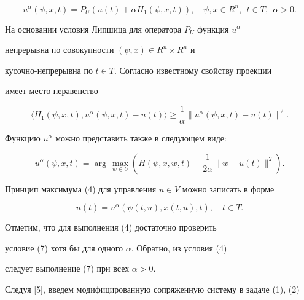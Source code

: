 $$


u^{\alpha}(\psi,x,t)=P_{U}(u(t)+\alpha{H_1}(\psi,x,t)),\quad\psi,x\in{R^n},


\ \ t\in{T}, \ \ \alpha>0.


$$





На основании условия Липшица для оператора $P_{U}$ функция $u^\alpha$


непрерывна по совокупности $(\psi,x)\in{R^n}\times{R^n}$ и


кусочно-непрерывна по $t\in{T}$. Согласно известному свойству проекции


имеет место неравенство


\begin{equation}


\langle{H_1}(\psi,x,t),u^{\alpha}(\psi,x,t)-u(t)\rangle\geq\frac{1}{\alpha}


\|u^{\alpha}(\psi,x,t)-u(t)\|^{2}.


\end{equation}


Функцию $u^{\alpha}$ можно представить также в следующем виде:


\begin{equation}


u^{\alpha}(\psi,x,t)=\arg\,\max\limits_{w\in{U}}(H(\psi,x,w,t)-


\frac{1}{2\alpha}\|w-u(t)\|^2).


\end{equation}





Принцип максимума (4) для управления $u\in{V}$ можно записать в форме


\begin{equation}


u(t)=u^{\alpha}(\psi(t,u),x(t,u),t),\quad{t}\in{T}.


\end{equation}





Отметим, что для выполнения (4) достаточно проверить


условие (7) хотя бы для одного $\alpha$. Обратно, из условия (4)


следует выполнение (7) при всех $\alpha>0$.





Следуя [5], введем модифицированную сопряженную систему в задаче (1), (2)


